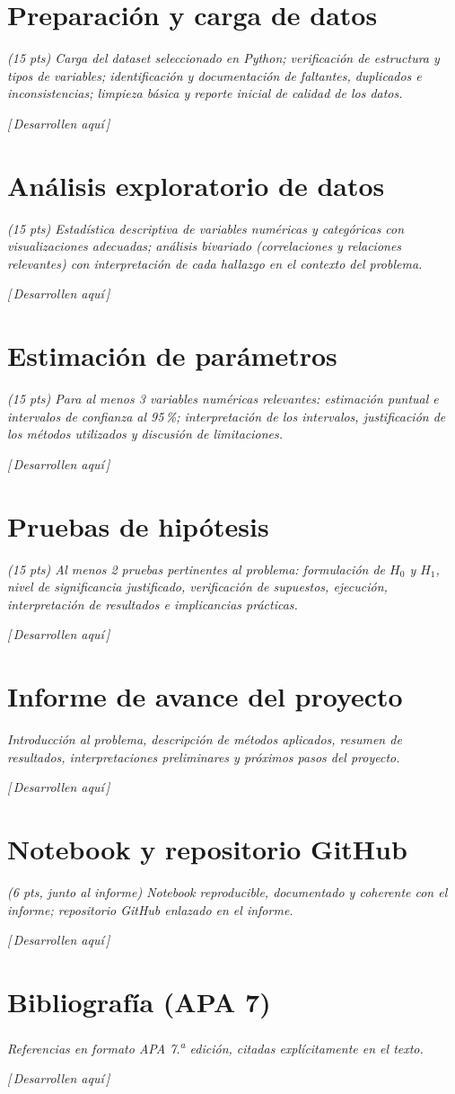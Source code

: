 \documentclass[11pt,a4paper]{article}
\newcommand{\guia}[1]{{\small\itshape\color{gris}#1}\par\vspace{0.15em}}
\newcommand{\resp}{{\footnotesize\itshape\color{fillgray}[\,Desarrollen aquí\,]}\par\vspace{1.1em}}
\begin{document}
\vspace{0.5em}
\tableofcontents
\newpage

\section{Preparación y carga de datos}
\guia{(15 pts) Carga del dataset seleccionado en Python; verificación de estructura y tipos de variables; identificación y documentación de faltantes, duplicados e inconsistencias; limpieza básica y reporte inicial de calidad de los datos.}
\resp

\section{Análisis exploratorio de datos}
\guia{(15 pts) Estadística descriptiva de variables numéricas y categóricas con visualizaciones adecuadas; análisis bivariado (correlaciones y relaciones relevantes) con interpretación de cada hallazgo en el contexto del problema.}
\resp

\section{Estimación de parámetros}
\guia{(15 pts) Para al menos 3 variables numéricas relevantes: estimación puntual e intervalos de confianza al 95\,\%; interpretación de los intervalos, justificación de los métodos utilizados y discusión de limitaciones.}
\resp

\section{Pruebas de hipótesis}
\guia{(15 pts) Al menos 2 pruebas pertinentes al problema: formulación de $H_0$ y $H_1$, nivel de significancia justificado, verificación de supuestos, ejecución, interpretación de resultados e implicancias prácticas.}
\resp

\section{Informe de avance del proyecto}
\guia{Introducción al problema, descripción de métodos aplicados, resumen de resultados, interpretaciones preliminares y próximos pasos del proyecto.}
\resp

\section{Notebook y repositorio GitHub}
\guia{(6 pts, junto al informe) Notebook reproducible, documentado y coherente con el informe; repositorio GitHub enlazado en el informe.}
\resp

\section{Bibliografía (APA 7)}
\guia{Referencias en formato APA 7.\textsuperscript{a} edición, citadas explícitamente en el texto.}
\resp
\end{document}

